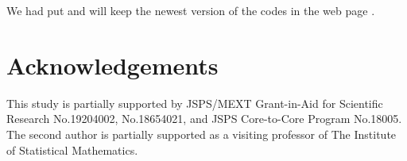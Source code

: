 \documentclass{svmult}
\begin{document}
We had put and will keep the newest version of the codes 
in the web page \cite{web:SFMT}.

\section*{Acknowledgements}
This study is partially
supported by JSPS/MEXT Grant-in-Aid for Scientific Research
No.19204002, No.18654021, and JSPS Core-to-Core Program
No.18005. The second author is partially supported
as a visiting professor of The Institute of Statistical 
Mathematics.



\end{document}
